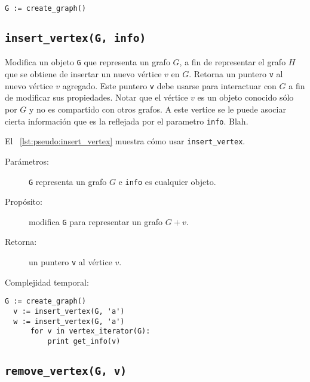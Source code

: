 \documentclass[a4paper,12pt]{article}
\makeatletter
\newcommand{\Code}[1]{\lstinline[basicstyle={\tt}]@#1@}
\makeatother
\begin{document}
\begin{lstlisting}[caption={Ejemplo de uso de create\_graph},gobble=2,float=ht,label={lst:pseudo:create_graph},emph={create_graph}]
  G := create_graph()
\end{lstlisting}

\subsection{\texttt{insert\_vertex(G, info)}}
\label{sec:tad grafo:insert-vertex}

Modifica un objeto \Code{G} que representa un grafo $G$, a fin de representar el grafo $H$ que se obtiene de insertar un nuevo vértice $v$ en $G$.  Retorna un puntero \Code{v} al nuevo vértice $v$ agregado.  Este puntero \Code{v} debe usarse para interactuar con $G$ a fin de modificar sus propiedades.  Notar que el vértice $v$ es un objeto conocido sólo por $G$ y no es compartido con otros grafos.  A este vertice se le puede asociar cierta información que es la reflejada por el parametro \Code{info}.  Blah.

El \lstlistingname~\ref{lst:pseudo:insert_vertex} muestra cómo usar \texttt{insert\_vertex}.
  
\begin{description}
  \item [Parámetros:] \Code{G} representa un grafo $G$ e \Code{info} es cualquier objeto.
  \item [Propósito:] modifica \Code{G} para representar un grafo $G + v$.
  \item [Retorna:] un puntero \Code{v} al vértice $v$.
  \item [Complejidad temporal:]
\end{description}


\begin{lstlisting}[caption={Ejemplo de uso de insert\_vertex.  Crea un grafo $G$ con dos vértices, ambos con la letra ``a'' como información.  Luego, el ciclo imprime ``aa''. Ver Sección~\ref{sec:tad grafo:vertex-iterator} para más información de \texttt{vertex\_iterator}.},gobble=2,float=ht,label={lst:pseudo:insert_vertex},emph={insert_vertex}]
  G := create_graph()
  v := insert_vertex(G, 'a')
  w := insert_vertex(G, 'a')
      for v in vertex_iterator(G):
          print get_info(v)
\end{lstlisting}


\subsection{\texttt{remove\_vertex(G, v)}}
\label{sec:tad grafo:remove-vertex}
\end{document}

